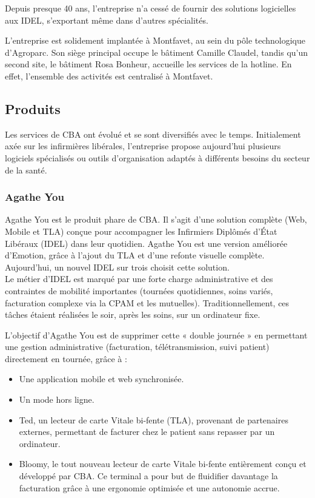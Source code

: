 \documentclass{article}
\begin{document}
Depuis presque 40 ans, l'entreprise n'a cessé de fournir des solutions logicielles aux IDEL, s'exportant même dans d'autres spécialités.

L'entreprise est solidement implantée à Montfavet, au sein du pôle technologique d'Agroparc. Son siège principal occupe le bâtiment Camille Claudel, tandis qu'un second site, le bâtiment Rosa Bonheur, accueille les services de la hotline. En effet, l'ensemble des activités est centralisé à Montfavet.

\subsection{Produits}

Les services de CBA ont évolué et se sont diversifiés avec le temps. Initialement axée sur les infirmières libérales, l'entreprise propose aujourd'hui plusieurs logiciels spécialisés ou outils d'organisation adaptés à différents besoins du secteur de la santé.

\subsubsection{Agathe You}

Agathe You est le produit phare de CBA. Il s'agit d'une solution complète (Web, Mobile et TLA) conçue pour accompagner les Infirmiers Diplômés d'État Libéraux (IDEL) dans leur quotidien.
Agathe You est une version améliorée d'Emotion, grâce à l'ajout du TLA et d'une refonte visuelle complète.
Aujourd'hui, un nouvel IDEL sur trois choisit cette solution.\\

Le métier d'IDEL est marqué par une forte charge administrative et des contraintes de mobilité importantes (tournées quotidiennes, soins variés, facturation complexe via la CPAM et les mutuelles). Traditionnellement, ces tâches étaient réalisées le soir, après les soins, sur un ordinateur fixe.

L'objectif d'Agathe You est de supprimer cette « double journée » en permettant une gestion administrative (facturation, télétransmission, suivi patient) directement en tournée, grâce à :

\begin{itemize}
    \item Une application mobile et web synchronisée.
    \item Un mode hors ligne.
    \item Ted, un lecteur de carte Vitale bi-fente (TLA), provenant de partenaires externes, permettant de facturer chez le patient sans repasser par un ordinateur.
    \item Bloomy, le tout nouveau lecteur de carte Vitale bi-fente entièrement conçu et développé par CBA. Ce terminal a pour but de fluidifier davantage la facturation grâce à une ergonomie optimisée et une autonomie accrue.
\end{itemize}
\end{document}
